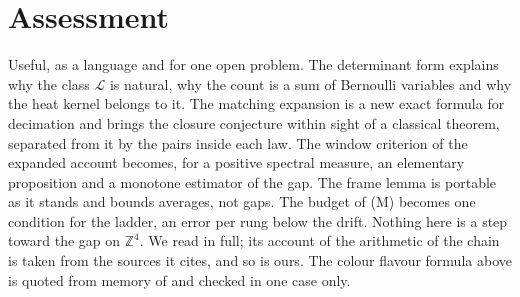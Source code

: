 \section{Assessment}

Useful, as a language and for one open problem. The determinant form explains why the class $\mathcal L$ is natural, why the count is a sum of Bernoulli variables and why the heat kernel belongs to it. The matching expansion is a new exact formula for decimation and brings the closure conjecture within sight of a classical theorem, separated from it by the pairs inside each law. The window criterion of the expanded account becomes, for a positive spectral measure, an elementary proposition and a monotone estimator of the gap. The frame lemma is portable as it stands and bounds averages, not gaps. The budget of (M) becomes one condition for the ladder, an error per rung below the drift. Nothing here is a step toward the gap on $\mathbb Z^4$. We read \cite{PS26t} in full; its account of the arithmetic of the chain is taken from the sources it cites, and so is ours. The colour flavour formula above is quoted from memory of \cite{Zi96} and checked in one case only.


